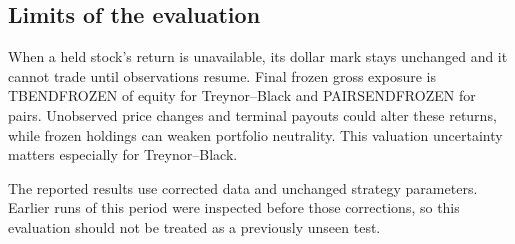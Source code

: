 \subsection{Limits of the evaluation}

When a held stock's return is unavailable, its dollar mark stays unchanged
and it cannot trade until observations resume. Final frozen gross exposure
is TBENDFROZEN of equity for Treynor--Black and PAIRSENDFROZEN for pairs.
Unobserved price changes and terminal payouts could alter these returns,
while frozen holdings can weaken portfolio neutrality. This valuation
uncertainty matters especially for Treynor--Black.

The reported results use corrected data and unchanged strategy parameters.
Earlier runs of this period were inspected before those corrections, so
this evaluation should not be treated as a previously unseen test.

